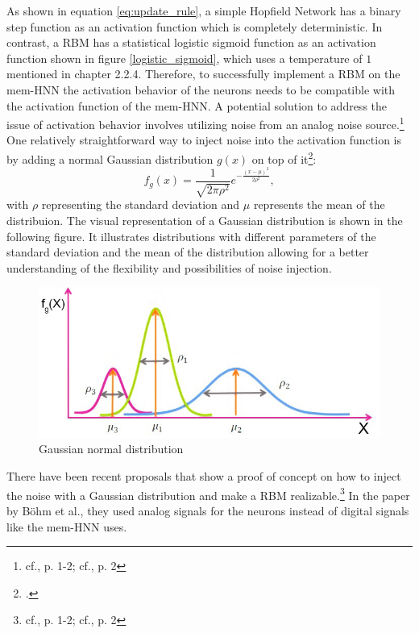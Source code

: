 As shown in equation \ref{eq:update_rule}, a simple Hopfield Network has a binary step function as an activation function which is completely deterministic.
In contrast, a \ac{RBM} has a statistical logistic sigmoid function as an activation function shown in figure \ref{logistic_sigmoid}, which uses a temperature of \(1\) mentioned in chapter 2.2.4.
Therefore, to successfully implement a \ac{RBM} on the \ac{mem-HNN} the activation behavior of the neurons needs to be compatible with the activation function of the \ac{mem-HNN}.
A potential solution to address the issue of activation behavior involves utilizing noise from an analog noise source.\footnote{cf.\cite{bohmNoiseinjectedAnalogIsing2022}, p. 1-2; cf.\cite{mahmoodiVersatileStochasticDot2019}, p. 2}
One relatively straightforward way to inject noise into the activation function is by adding a normal Gaussian distribution \(g(x)\) on top of it\footcite[cf.][3]{bohmNoiseinjectedAnalogIsing2022}:
\begin{equation}
    f_g(x) = \frac{1}{\sqrt{2\pi\rho^2}} e^{-\frac{(x-\mu)^2}{2\rho^2}},
\end{equation}
with \(\rho\) representing the standard deviation and \(\mu\) represents the mean of the distribuion.
The visual representation of a Gaussian distribution is shown in the following figure. 
It illustrates distributions with different parameters of the standard deviation and the mean of the distribution allowing for a better understanding of the flexibility and possibilities of noise injection. 
\begin{figure}[H]
    \centering
    \includegraphics[width=0.6\linewidth]{graphics/Gaussian_Normal_Distribution_edited.jpg}
    \caption{Gaussian normal distribution\protect\footnotemark}
    \label{normalGaussianDistribution}
\end{figure}
There have been recent proposals that show a proof of concept on how to inject the noise with a Gaussian distribution and make a \ac{RBM} realizable.\footnote{cf.\cite{bohmNoiseinjectedAnalogIsing2022}, p. 1-2; cf.\cite{mahmoodiVersatileStochasticDot2019}, p. 2}
In the paper by Böhm et al., they used analog signals for the neurons instead of digital signals like the \ac{mem-HNN} uses. 
